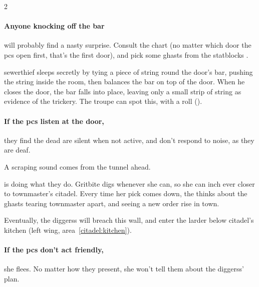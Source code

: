 \begin{multicols}{2}
\paragraph{Anyone knocking off the bar}
will probably find a nasty surprise.
Consult the chart (no matter which door the \glspl{pc} open first, that's the first door), and pick some \glspl{ghast} from the \glspl{statblock} .

\Gls{sewerthief} sleeps secretly by tying a piece of string round the door's bar, pushing the string inside the room, then balances the bar on top of the door.
When he closes the door, the bar falls into place, leaving only a small strip of string as evidence of the trickery.
The troupe can spot this, with a  roll (\tn[13]).

\paragraph{If the \glspl{pc} listen at the door,}
they find the dead are silent when not active, and don't respond to noise, as they are deaf.%

\sewerthief


\begin{boxtext}
  A scraping sound comes from the tunnel ahead.
\end{boxtext}

\begin{exampletext}
   is doing what they do.
  Gritbite digs whenever she can, so she can inch ever closer to \gls{townmaster}'s citadel.
  Every time her pick comes down, the thinks about the ghasts tearing \gls{townmaster} apart, and seeing a new order rise in \gls{town}.
\end{exampletext}

Eventually, the \glspl{diggers} will breach this wall, and enter the larder below \gls{citadel}'s kitchen (left wing, \gls{area}~\vref{citadel:kitchen}).

\paragraph{If the \glspl{pc} don't act friendly,}
she flees.
No matter how they present, she won't tell them about the \glspl{diggers}' plan.



\end{multicols}
